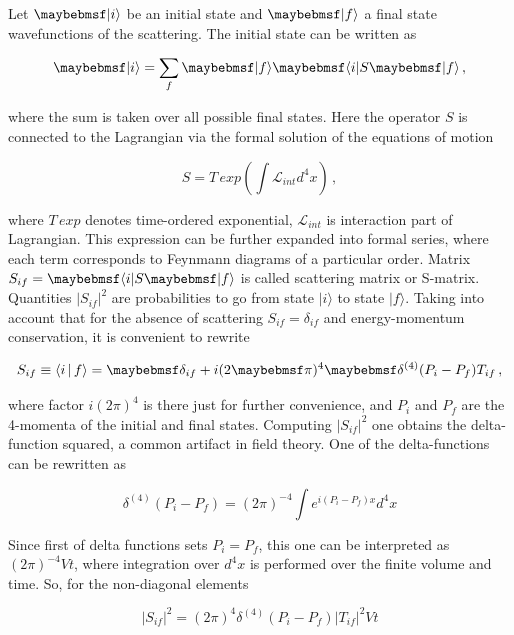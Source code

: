 Let $\ket{i}$ be an initial state and $\ket{f}$ a final state wavefunctions of
the scattering. The initial state  can be written as

\begin{equation}
  \ket{i} = \sum_{f} \ket{f} \bra{i} S \ket{f} \,,
\end{equation}

where the sum is taken over all possible final states. Here the operator $S$ is
connected to the Lagrangian via the formal solution of the equations of motion

\begin{equation}
  S = T \, exp \left(\int \mathcal{L}_{int} d^4x \right) \,,
\end{equation}

where $T \, exp$ denotes time-ordered exponential, $\mathcal{L}_{int}$ is
interaction part of Lagrangian. This expression can be further expanded into
formal series, where each term corresponds to Feynmann diagrams of a particular
order. Matrix $S_{if} = \bra{i} S \ket{f}$ is called scattering matrix or
S-matrix. Quantities $|S_{if}|^2$ are probabilities to go from state
$|i\rangle$ to state $|f\rangle$. Taking into account that for the absence of
scattering $S_{if} = \delta_{if}$ and energy-momentum conservation, it is
convenient to rewrite

\begin{equation}
  S_{if} \equiv \Braket{i|f}  = \delta_{if} + i(2\pi)^4 \delta^{(4)}(P_i-P_f) T_{if} \,,
\end{equation}

where factor $i (2\pi)^4$ is there just for further convenience, and $P_i$ and $P_f$ are the 4-momenta of the initial and final states. Computing
$|S_{if}|^2$ one obtains the delta-function squared, a common artifact in field
theory. One of the delta-functions can be rewritten as

\begin{equation}
  \delta^{(4)}(P_i-P_f) = (2\pi)^{-4} \int e^{i(P_i-P_f)x} d^4x
\end{equation}

Since first of delta functions sets $P_i=P_f$, this one can be interpreted as
$(2\pi)^{-4} Vt$, where integration over $d^4x$ is performed over the finite volume
and time. So, for the non-diagonal elements

\begin{equation} \label{eq:sif_sqr}
|S_{if}|^2 = (2\pi)^4 \delta^{(4)}(P_i-P_f) |T_{if}|^2 Vt
\end{equation}

